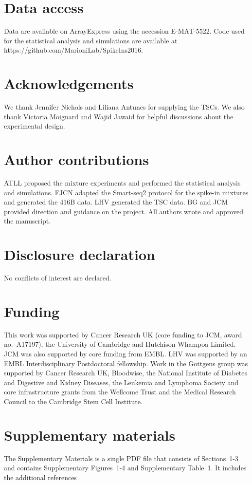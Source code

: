 \documentclass{article}
\newcommand{\suppfigbiophys}{4}
\newcommand{\suppsecsim}{3}
\begin{document}
\section{Data access}
Data are available on ArrayExpress using the accession E-MAT-5522.
Code used for the statistical analysis and simulations are available at https://github.com/MarioniLab/SpikeIns2016.

\section{Acknowledgements}
We thank Jennifer Nichols and Liliana Antunes for supplying the TSCs.
We also thank Victoria Moignard and Wajid Jawaid for helpful discussions about the experimental design.

\section{Author contributions}
ATLL proposed the mixture experiments and performed the statistical analysis and simulations.
FJCN adapted the Smart-seq2 protocol for the spike-in mixtures and generated the 416B data.
LHV generated the TSC data.
BG and JCM provided direction and guidance on the project.
All authors wrote and approved the manuscript.

\section{Disclosure declaration}
No conflicts of interest are declared.

\section{Funding}
This work was supported by Cancer Research UK (core funding to JCM, award no.\ A17197), the University of Cambridge and Hutchison Whampoa Limited.
JCM was also supported by core funding from EMBL.
LHV was supported by an EMBL Interdisciplinary Postdoctoral fellowship.
Work in the G\"ottgens group was supported by Cancer Research UK, Bloodwise, the National Institute of Diabetes and Digestive and Kidney Diseases, the Leukemia and Lymphoma Society and core infrastructure grants from the Wellcome Trust and the Medical Research Council to the Cambridge Stem Cell Institute.

\section{Supplementary materials}
The Supplementary Materials is a single PDF file that consists of Sections~1-\suppsecsim{} and contains Supplementary Figures~1-\suppfigbiophys{} and Supplementary Table~1.
It includes the additional references \cite{law2014voom,ritchie2015limma}.

{\small


}
\end{document}
